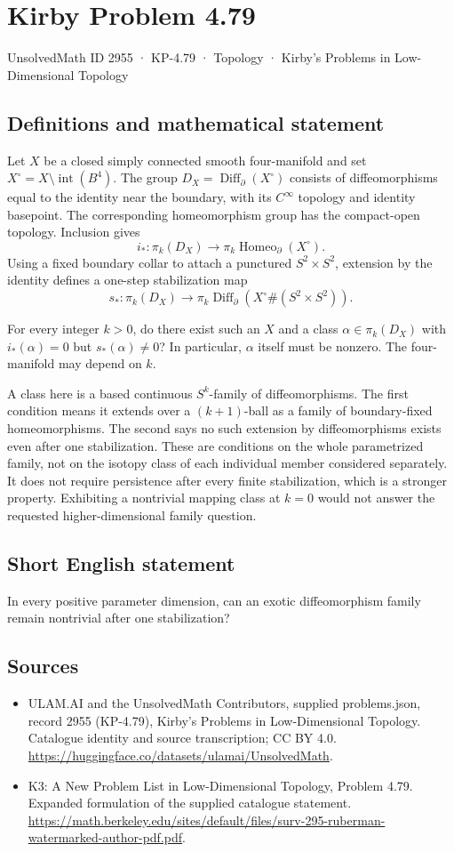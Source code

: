 \documentclass[11pt,a4paper]{article}
\begin{document}
\section*{Kirby Problem 4.79}\label{2955}
{\small UnsolvedMath ID 2955 · KP-4.79 · Topology · Kirby's Problems in Low-Dimensional Topology}
\subsection{Definitions and mathematical statement}
Let $X$ be a closed simply connected smooth four-manifold and set $X^\circ=X\setminus\operatorname{int}(B^4)$. The group $D_X=\operatorname{Diff}_\partial(X^\circ)$ consists of diffeomorphisms equal to the identity near the boundary, with its $C^\infty$ topology and identity basepoint. The corresponding homeomorphism group has the compact-open topology. Inclusion gives
\[
i_*:\pi_k(D_X)\to\pi_k\operatorname{Homeo}_\partial(X^\circ).
\]
Using a fixed boundary collar to attach a punctured $S^2\times S^2$, extension by the identity defines a one-step stabilization map
\[
s_*:\pi_k(D_X)\to
\pi_k\operatorname{Diff}_\partial(X^\circ\#(S^2\times S^2)).
\]

For every integer $k>0$, do there exist such an $X$ and a class $\alpha\in\pi_k(D_X)$ with $i_*(\alpha)=0$ but $s_*(\alpha)\ne0$? In particular, $\alpha$ itself must be nonzero. The four-manifold may depend on $k$.

A class here is a based continuous $S^k$-family of diffeomorphisms. The first condition means it extends over a $(k+1)$-ball as a family of boundary-fixed homeomorphisms. The second says no such extension by diffeomorphisms exists even after one stabilization. These are conditions on the whole parametrized family, not on the isotopy class of each individual member considered separately. It does not require persistence after every finite stabilization, which is a stronger property. Exhibiting a nontrivial mapping class at $k=0$ would not answer the requested higher-dimensional family question.
\subsection{Short English statement}
In every positive parameter dimension, can an exotic diffeomorphism family remain nontrivial after one stabilization?
\subsection{Sources}
\begin{itemize}
\item[S1] ULAM.AI and the UnsolvedMath Contributors, supplied problems.json, record 2955 (KP-4.79), Kirby's Problems in Low-Dimensional Topology. Catalogue identity and source transcription; CC BY 4.0.
\url{https://huggingface.co/datasets/ulamai/UnsolvedMath}.
\item[S2] K3: A New Problem List in Low-Dimensional Topology, Problem 4.79. Expanded formulation of the supplied catalogue statement.
\url{https://math.berkeley.edu/sites/default/files/surv-295-ruberman-watermarked-author-pdf.pdf}.
\end{itemize}
\end{document}
